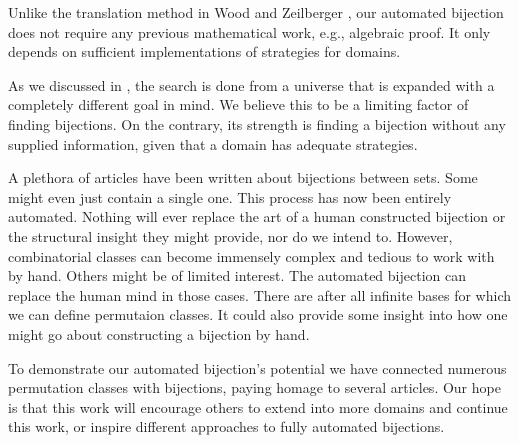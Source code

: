 Unlike the translation method in Wood and Zeilberger \cite{wood_zeilberger}, our automated bijection does not require any previous mathematical work, e.g., algebraic proof. It only depends on sufficient implementations of strategies for domains.

As we discussed in , the search is done from a universe that is expanded with a completely different goal in mind. We believe this to be a limiting factor of finding bijections. On the contrary, its strength is finding a bijection without any supplied information, given that a domain has adequate strategies.

A plethora of articles have been written about bijections between sets. Some might even just contain a single one. This process has now been entirely automated. Nothing will ever replace the art of a human constructed bijection or the structural insight they might provide, nor do we intend to. However, combinatorial classes can become immensely complex and tedious to work with by hand. Others might be of limited interest. The automated bijection can replace the human mind in those cases. There are after all infinite bases for which we can define permutaion classes. It could also provide some insight into how one might go about constructing a bijection by hand.

To demonstrate our automated bijection's potential we have connected numerous permutation classes with bijections, paying homage to several articles. Our hope is that this work will encourage others to extend \css{} into more domains and continue this work, or inspire different approaches to fully automated bijections.